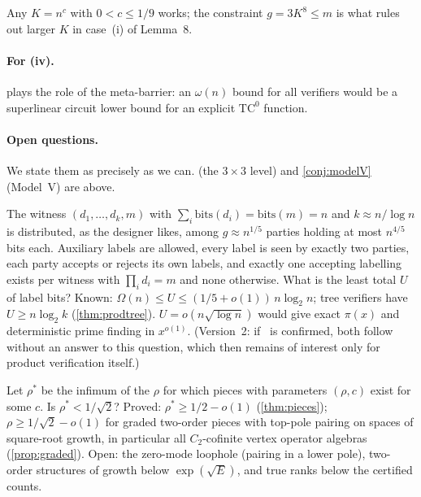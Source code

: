 \documentclass[10pt]{amsart}
\theoremstyle{plain}
\theoremstyle{definition}
\theoremstyle{remark}
\numberwithin{equation}{section}
\begin{document}
\noindent Any $K=n^c$ with $0<c\le1/9$ works; the constraint $g=3K^8\le m$ is what rules out larger $K$
in case~(i) of Lemma~8.

\paragraph{For (iv).}  plays the role of the meta-barrier: an $\omega(n)$ bound for
all verifiers would be a superlinear circuit lower bound for an explicit $\mathrm{TC}^0$ function.

\paragraph{Open questions.} We state them as precisely as we can.  (the $3\times3$
level) and \cref{conj:modelV} (Model~V) are above.

\begin{question}\label{q:product}
The witness $(d_1,\dots,d_k,m)$ with $\sum_i\mathrm{bits}(d_i)=\mathrm{bits}(m)=n$ and $k\approx n/\log n$ is
distributed, as the designer likes, among $g\approx n^{1/5}$ parties holding at most $n^{4/5}$ bits each.
Auxiliary labels are allowed, every label is seen by exactly two parties, each party accepts or
rejects its own labels, and exactly one accepting labelling exists per witness with $\prod_id_i=m$ and
none otherwise. What is the least total $U$ of label bits? Known:
$\Omega(n)\le U\le(1/5+o(1))\,n\log_2n$; tree verifiers have $U\ge n\log_2k$ (\cref{thm:prodtree}).
$U=o(n\sqrt{\log n})$ would give exact $\pi(x)$ and deterministic prime finding in $x^{o(1)}$.
(Version~2: if~\cite{Ni26} is confirmed, both follow without an answer to this question, which then
remains of interest only for product verification itself.)
\end{question}

\begin{question}\label{q:rho}
Let $\rho^*$ be the infimum of the $\rho$ for which pieces with parameters $(\rho,c)$ exist for some
$c$. Is $\rho^*<1/\sqrt2$? Proved: $\rho^*\ge1/2-o(1)$ (\cref{thm:pieces}); $\rho\ge1/\sqrt2-o(1)$ for graded
two-order pieces with top-pole pairing on spaces of square-root growth, in particular all
$C_2$-cofinite vertex operator algebras (\cref{prop:graded}). Open: the zero-mode loophole (pairing
in a lower pole), two-order structures of growth below $\exp(\sqrt E)$, and true ranks below the
certified counts.
\end{question}
\end{document}
